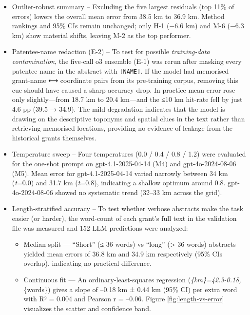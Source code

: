\begin{itemize}
\item
  Outlier-robust summary -- Excluding the five largest residuals (top
  11\% of errors) lowers the overall mean error from 38.5 km to 36.9 km.
  Method rankings and 95\% CIs remain unchanged; only H-1
  \citep{Bashorun2025_gis} (−6.6 km) and M-6 (−6.3 km) show material
  shifts, leaving M-2 as the top performer.
\item
  Patentee-name redaction (E-2) -- To test for possible
  \emph{training-data contamination}, the five-call o3 ensemble (E-1)
  was rerun after masking every patentee name in the abstract with
  \passthrough{\lstinline![NAME]!}. If the model had memorised
  grant-name ⟷ coordinate pairs from its pre-training corpus, removing
  this cue should have caused a sharp accuracy drop. In practice mean
  error rose only slightly---from 18.7 km to 20.4 km---and the ≤10 km
  hit-rate fell by just 4.6 pp (39.5 → 34.9). The mild degradation
  indicates that the model is drawing on the descriptive toponyms and
  spatial clues in the text rather than retrieving memorised locations,
  providing no evidence of leakage from the historical grants
  themselves.
\item
  Temperature sweep -- Four temperatures (0.0 / 0.4 / 0.8 / 1.2) were
  evaluated for the one-shot prompt on gpt-4.1-2025-04-14 (M4) and
  gpt-4o-2024-08-06 (M5). Mean error for gpt-4.1-2025-04-14 varied
  narrowly between 34 km (\emph{t}=0.0) and 31.7 km (\emph{t}=0.8),
  indicating a shallow optimum around 0.8. gpt-4o-2024-08-06 showed no
  systematic trend (32--33 km across the grid).
\item
  Length‐stratified accuracy -- To test whether verbose abstracts make
  the task easier (or harder), the word-count of each grant's full text
  in the validation file was measured and 152 LLM predictions were
  analyzed:

  \begin{itemize}
  \tightlist
  \item
    Median split --- ``Short'' (≤ 36 words) vs ``long'' (\textgreater{}
    36 words) abstracts yielded mean errors of 36.8 km and 34.9 km
    respectively (95\% CIs overlap), indicating no practical
    difference.\\
  \item
    Continuous fit --- An ordinary-least-squares regression
    (\emph{\{km\}=42.3-0.18,}\{words\}) gives a
    slope of --0.18 km ± 0.44 km (95\% CI) per extra word with R² =
    0.004 and Pearson r = --0.06. Figure \ref{fig:length-vs-error}
    visualizes the scatter and confidence band.
  \end{itemize}
\end{itemize}


